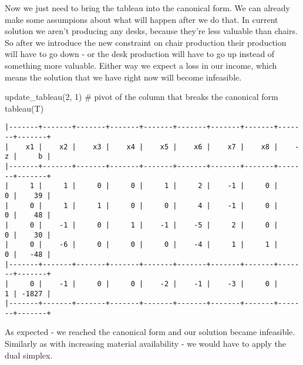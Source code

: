 \documentclass[
  letterpaper,
  DIV=11,
  numbers=noendperiod]{scrartcl}
\newenvironment{Shaded}{\begin{snugshade}}{\end{snugshade}}
\newcommand{\CommentTok}[1]{\textcolor[rgb]{0.37,0.37,0.37}{#1}}
\newcommand{\DecValTok}[1]{\textcolor[rgb]{0.68,0.00,0.00}{#1}}
\newcommand{\NormalTok}[1]{\textcolor[rgb]{0.00,0.23,0.31}{#1}}
\begin{document}
\normalsize

Now we just need to bring the tableau into the canonical form. We can
already make some assumpions about what will happen after we do that. In
current solution we aren't producing any desks, because they're less
valuable than chairs. So after we introduce the new constraint on chair
production their production will have to go down - or the desk
production will have to go up instead of something more valuable. Either
way we expect a loss in our income, which means the solution that we
have right now will become infeasible.

\small

\begin{Shaded}
\begin{Highlighting}[]
\NormalTok{update\_tableau(}\DecValTok{2}\NormalTok{, }\DecValTok{1}\NormalTok{) }\CommentTok{\# pivot of the column that breaks the canonical form}
\NormalTok{tableau(T)}
\end{Highlighting}
\end{Shaded}

\begin{verbatim}
|-------+-------+-------+-------+-------+-------+-------+-------+-------+-------+
|    x1 |    x2 |    x3 |    x4 |    x5 |    x6 |    x7 |    x8 |    -z |     b |
|-------+-------+-------+-------+-------+-------+-------+-------+-------+-------+
|     1 |     1 |     0 |     0 |     1 |     2 |    -1 |     0 |     0 |    39 |
|     0 |     1 |     1 |     0 |     0 |     4 |    -1 |     0 |     0 |    48 |
|     0 |    -1 |     0 |     1 |    -1 |    -5 |     2 |     0 |     0 |    30 |
|     0 |    -6 |     0 |     0 |     0 |    -4 |     1 |     1 |     0 |   -48 |
|-------+-------+-------+-------+-------+-------+-------+-------+-------+-------+
|     0 |    -1 |     0 |     0 |    -2 |    -1 |    -3 |     0 |     1 | -1827 |
|-------+-------+-------+-------+-------+-------+-------+-------+-------+-------+
\end{verbatim}

\normalsize

As expected - we reached the canonical form and our solution became
infeasible. Similarly as with increasing material availability - we
would have to apply the dual simplex.
\end{document}
